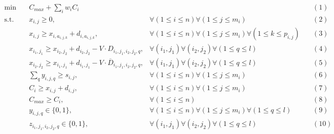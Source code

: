 \documentclass[12pt,a4paper]{article}
\begin{document}
$$
\begin{aligned}
\textrm{min}\quad& C_{max}+\sum_{i}w_i C_i &&(1)\\
\textrm{s.t.}\quad& x_{i,j}\geq0, & \forall(1\leq i\leq n)\forall(1\leq j\leq m_i)\quad&(2)\\
& x_{i,j}\geq x_{i,a_{i,j,k}}+d_{i,a_{i,j,k}}, & \forall(1\leq i\leq n)\forall(1\leq j\leq m_i)\forall(1\leq k\leq p_{i,j})\quad&(3)\\
& x_{i_1,j_1}\geq x_{i_2,j_2}+d_{i_2,j_2}-V\cdot D_{i_1,j_1,i_2,j_2,q}, & \forall(i_1,j_1)\forall(i_2,j_2)\forall(1\leq q\leq l)\quad&(4)\\
& x_{i_2,j_2}\geq x_{i_1,j_1}+d_{i_1,j_1}-V\cdot\overline{D}_{i_1,j_1,i_2,j_2,q}, & \forall(i_1,j_1)\forall(i_2,j_2)\forall(1\leq q\leq l)\quad&(5)\\
& \sum_{q}y_{i,j,q}\geq s_{i,j}, & \forall(1\leq i\leq n)\forall(1\leq j\leq m_i)\quad&(6)\\
& C_i\geq x_{i,j}+d_{i,j}, & \forall(1\leq i\leq n)\forall(1\leq j\leq m_i)\quad&(7)\\
& C_{max}\geq C_i, & \forall(1\leq i\leq n)\quad&(8)\\
& y_{i,j,q}\in\{0,1\}, & \forall(1\leq i\leq n)\forall(1\leq j\leq m_i)\forall(1\leq q\leq l)\quad&(9)\\
& z_{i_1,j_1,i_2,j_2,q}\in\{0,1\}, & \forall(i_1,j_1)\forall(i_2,j_2)\forall(1\leq q\leq l)\quad&(10)\\
& & \\
\end{aligned}
$$
\end{document}
